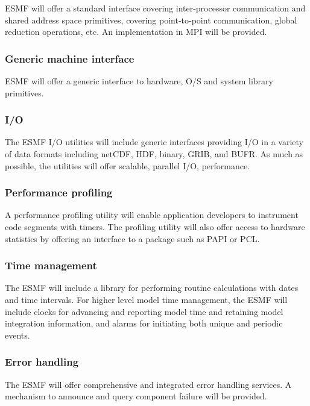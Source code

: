 ESMF will offer a standard interface covering inter-processor
communication and shared address space primitives, covering
point-to-point communication, global reduction operations, etc. An
implementation in MPI will be provided.

\subsubsection{Generic machine interface}

ESMF will offer a generic interface to hardware, O/S and system
library primitives.

\subsubsection{I/O}

The ESMF I/O utilities will include generic interfaces providing I/O
in a variety of data formats including netCDF, HDF, binary, GRIB, and
BUFR. As much as possible, the utilities will offer scalable, parallel I/O,
performance.

\subsubsection{Performance profiling}

A performance profiling utility will enable application developers to 
instrument code segments with timers. The profiling utility will also
offer access to hardware statistics by offering an interface to a
package such as PAPI or PCL.

\subsubsection{Time management}

The ESMF will include a library for performing routine 
calculations with dates and time intervals.  For higher level model
time management, the ESMF will include clocks for advancing and 
reporting model time and retaining model integration information, 
and alarms for initiating both unique and periodic events.

\subsubsection{Error handling}

The ESMF will offer comprehensive and integrated error handling
services.  A mechanism to announce and query component failure will be
provided.

